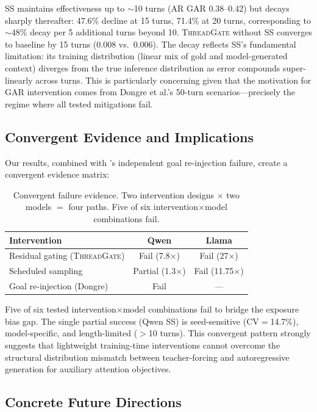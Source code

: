 \documentclass[11pt]{article}
\newcommand{\gar}{\textsc{GAR}}
\newcommand{\tg}{\textsc{ThreadGate}}
\begin{document}
SS maintains effectiveness up to $\sim$10 turns (AR \gar{} 0.38--0.42) but decays sharply thereafter: 47.6\% decline at 15 turns, 71.4\% at 20 turns, corresponding to $\sim$48\% decay per 5 additional turns beyond 10. \tg{} without SS converges to baseline by 15 turns (0.008 vs.\ 0.006). The decay reflects SS's fundamental limitation: its training distribution (linear mix of gold and model-generated context) diverges from the true inference distribution as error compounds super-linearly across turns. This is particularly concerning given that the motivation for \gar{} intervention comes from Dongre et al.'s 50-turn scenarios---precisely the regime where all tested mitigations fail.

\subsection{Convergent Evidence and Implications}
\label{sec:convergent}

Our results, combined with \citet{dongre2026goal}'s independent goal re-injection failure, create a convergent evidence matrix:

\begin{table}[h]
\centering
\small
\caption{Convergent failure evidence. Two intervention designs $\times$ two models $=$ four paths. Five of six intervention$\times$model combinations fail.}
\label{tab:convergent}
\begin{tabular}{lcc}
\toprule
\textbf{Intervention} & \textbf{Qwen} & \textbf{Llama} \\
\midrule
Residual gating (\tg{}) & Fail (7.8$\times$) & Fail (27$\times$) \\
Scheduled sampling & Partial (1.3$\times$) & Fail (11.75$\times$) \\
Goal re-injection (Dongre) & Fail & --- \\
\bottomrule
\end{tabular}
\end{table}

Five of six tested intervention$\times$model combinations fail to bridge the exposure bias gap. The single partial success (Qwen SS) is seed-sensitive (CV$=$14.7\%), model-specific, and length-limited ($>$10 turns). This convergent pattern strongly suggests that lightweight training-time interventions cannot overcome the structural distribution mismatch between teacher-forcing and autoregressive generation for auxiliary attention objectives.

\subsection{Concrete Future Directions}
\end{document}
